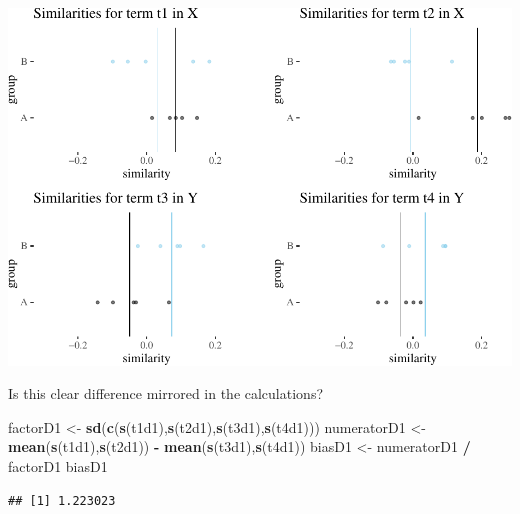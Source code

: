 \documentclass[10pt,dvipsnames,enabledeprecatedfontcommands]{scrartcl}
\newenvironment{Shaded}{\begin{snugshade}}{\end{snugshade}}
\newcommand{\KeywordTok}[1]{\textcolor[rgb]{0.13,0.29,0.53}{\textbf{#1}}}
\newcommand{\StringTok}[1]{\textcolor[rgb]{0.31,0.60,0.02}{#1}}
\newcommand{\OperatorTok}[1]{\textcolor[rgb]{0.81,0.36,0.00}{\textbf{#1}}}
\newcommand{\NormalTok}[1]{#1}
\begin{document}
\normalsize

\vspace{1mm} \footnotesize

\begin{center}\includegraphics[width=1\linewidth]{paperDraft_files/figure-latex/unnamed-chunk-14-1} \end{center}

\normalsize

\noindent  Is this clear difference mirrored in the calculations?

\footnotesize

\begin{Shaded}
\begin{Highlighting}[]
\NormalTok{factorD1 <-}\StringTok{ }\KeywordTok{sd}\NormalTok{(}\KeywordTok{c}\NormalTok{(}\KeywordTok{s}\NormalTok{(t1d1),}\KeywordTok{s}\NormalTok{(t2d1),}\KeywordTok{s}\NormalTok{(t3d1),}\KeywordTok{s}\NormalTok{(t4d1)))}
\NormalTok{numeratorD1 <-}\StringTok{  }\KeywordTok{mean}\NormalTok{(}\KeywordTok{s}\NormalTok{(t1d1),}\KeywordTok{s}\NormalTok{(t2d1)) }\OperatorTok{-}\StringTok{ }\KeywordTok{mean}\NormalTok{(}\KeywordTok{s}\NormalTok{(t3d1),}\KeywordTok{s}\NormalTok{(t4d1))}
\NormalTok{biasD1 <-}\StringTok{ }\NormalTok{numeratorD1 }\OperatorTok{/}\StringTok{ }\NormalTok{factorD1}
\NormalTok{biasD1}
\end{Highlighting}
\end{Shaded}

\begin{verbatim}
## [1] 1.223023
\end{verbatim}

\normalsize 
\end{document}

